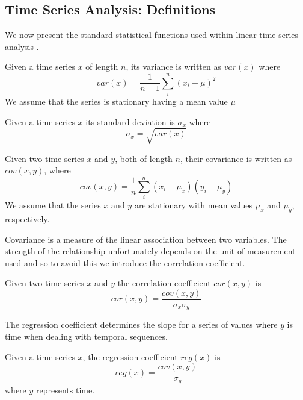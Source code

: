\subsection{Time Series Analysis: Definitions}\label{subsec:tl_tsadefs}

We now present the standard statistical functions used within linear
time series analysis \cite{ko90}.
\begin{definition}[Variance]\label{def:var}
\begin{rm}
Given a time series $x$ of length $n$, its variance is written as
$var(x)$ where
\[
var(x) = \frac{1}{n-1} \sum_i^n (x_i - \mu)^2
\]
We assume that the series is stationary having a mean value $\mu$
\end{rm}
\end{definition}

\begin{definition}\label{def:sd}
\begin{rm}
Given a time series $x$ its standard deviation is $\sigma_x$ where 
\[
\sigma_x = \sqrt{var(x)}
\]
\end{rm}
\end{definition}
\begin{definition}[Covariance]\label{def:covar}
\begin{rm}
Given two time series $x$ and $y$, both of length $n$, their
covariance is written as $cov(x,y)$, where
\[
cov(x,y) = \frac{1}{n} \sum_i^n (x_i - \mu_x) (y_i - \mu_y)
\]
We assume that the series $x$ and $y$ are stationary with mean values
$\mu_x$ and $\mu_y$, respectively.
\end{rm}
\end{definition}

Covariance is a measure of the linear association between two variables.
The strength of the relationship unfortunately depends on the unit of
measurement used and so to avoid this we introduce the correlation
coefficient.
\begin{definition}\label{def:correl}
\begin{rm}
Given two time series $x$ and $y$ the correlation coefficient
$cor(x,y)$ is
\[
cor(x,y) = \frac{cov(x,y)}{\sigma_x \sigma_y}
\]
\end{rm}
\end{definition}

The regression coefficient determines the slope for a series of values
where $y$ is time when dealing with temporal sequences.
\begin{definition}\label{def:regcoef}
\begin{rm}
Given a time series $x$, the regression coefficient
$reg(x)$ is
\[
reg(x) = \frac{cov(x,y)}{\sigma_y}
\]
where $y$ represents time.
\end{rm}
\end{definition}

